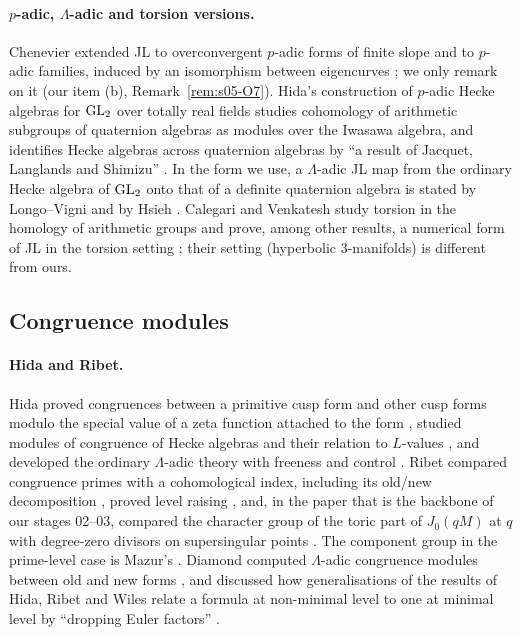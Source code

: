 \paragraph{$p$-adic, $\Lambda$-adic and torsion versions.} Chenevier extended JL to overconvergent $p$-adic forms of finite slope
and to $p$-adic families, induced by an isomorphism between eigencurves \cite[Abstract; Thm.~3, \S4.6]{Ch}; we only remark on it (our item (b), Remark~\ref{rem:s05-O7}). Hida's construction of
$p$-adic Hecke algebras for $\mathrm{GL}_2$ over totally real fields studies cohomology of arithmetic subgroups of quaternion algebras
as modules over the Iwasawa algebra, and identifies Hecke algebras across quaternion algebras by ``a result of Jacquet,
Langlands and Shimizu'' \cite[Thm.~2.1]{Hi88b}. In the form we use, a $\Lambda$-adic JL map from the ordinary Hecke algebra of
$\mathrm{GL}_2$ onto that of a definite quaternion algebra is stated by Longo--Vigni \cite[Prop.~6.1]{LV} and by Hsieh
\cite[\S4.5, Thm.~4.5]{Hs}. Calegari and Venkatesh study torsion in the homology of arithmetic groups and prove, among other results, a
numerical form of JL in the torsion setting \cite[Abstract]{CV12}; their setting (hyperbolic $3$-manifolds) is different from ours.

\subsection{Congruence modules}

\paragraph{Hida and Ribet.} Hida proved congruences between a primitive cusp form and other cusp forms modulo the special value
of a zeta function attached to the form \cite[\S0]{Hi81}, studied modules of congruence of Hecke algebras and their relation to
$L$-values \cite{Hi88a}, and developed the ordinary $\Lambda$-adic theory with freeness and control \cite[Thm.~3.1,
Cor.~3.2]{Hi86b}. Ribet compared congruence primes with a cohomological index, including its old/new decomposition
\cite[Prop.~1.2, Thm.~1.4]{Ri83}, proved level raising \cite{Ri84}, and, in the paper that is the backbone of our stages 02--03,
compared the character group of the toric part of $J_0(qM)$ at $q$ with degree-zero divisors on supersingular points
\cite[Prop.~3.1, Thm.~3.15, Thm.~4.1]{Ri90}. The component group in the prime-level case is Mazur's
\cite[Appendix, Thm.~A.1]{Mz}. Diamond computed $\Lambda$-adic congruence modules between old and new forms \cite[Thms.~6A--6C]{Dia89},
and discussed how generalisations of the results of Hida, Ribet and Wiles relate a formula at non-minimal level to one at
minimal level by ``dropping Euler factors'' \cite[Abstract]{DiaPNAS97}.

